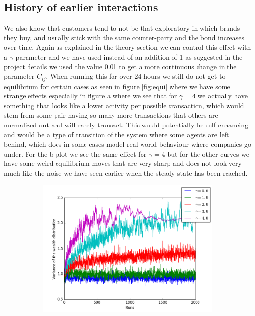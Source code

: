 \documentclass[a4paper,11pt]{article}
\begin{document}
{\subsection{History of earlier interactions}
We also know that customers tend to not be that exploratory in which brands they buy, and usually stick with the same counter-party and the bond increases over time.  Again as explained in the theory section we can control this effect with a $\gamma$ parameter and we have used instead of an addition of 1 as suggested in the project details we used the value 0.01 to get a more continuous change in the parameter $C_{ij}$. When running this for over 24 hours we still do not get to equilibrium for certain cases as seen in figure \ref{fig:equi} where we have some strange effects especially in figure a where we see that for $\gamma=4$ we actually have something that looks like a lower activity per possible transaction, which would stem from some pair having so many more transactions that others are normalized out and will rarely transact. This would potentially be self enhancing and would be a type of transition of the system where some agents are left behind, which does in some cases model real world behaviour where companies go under. For the b plot we see the same effect for $\gamma=4$ but for the other curves we have some weird equilibrium moves that are very sharp and does not look very much like the noise we have seen earlier when the steady state has been reached. 
\begin{figure}[H]
	\centering
	\begin{subfigure}[t]{0.45\textwidth}
		\includegraphics[scale=0.4]{historic_lambda=0_5_alpha=1initnr2}

\end{subfigure}
\end{figure}}
\end{document}
